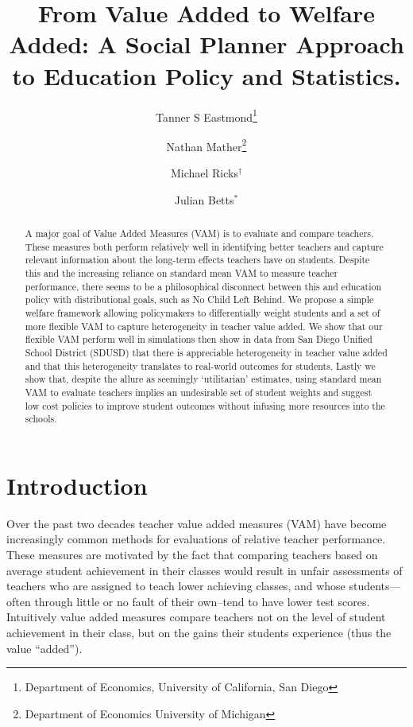 \documentclass[letterpaper,12pt]{article}
\title{From Value Added to Welfare Added: A Social Planner Approach to Education Policy and Statistics.}
\author{Tanner S Eastmond\thanks{Department of Economics, University of California, San Diego} \and Nathan Mather\thanks{Department of Economics University of Michigan} \and Michael Ricks$^\dagger$ \and Julian Betts$^*$}
\date{\vspace{-8ex}}
\begin{document}
\maketitle





\begin{abstract}
    A major goal of Value Added Measures (VAM) is to evaluate and compare teachers. These measures both perform relatively well in identifying better teachers and capture relevant information about the long-term effects teachers have on students. Despite this and the increasing reliance on standard mean VAM to measure teacher performance, there seems to be a philosophical disconnect between this and education policy with distributional goals, such as No Child Left Behind. We propose a simple welfare framework allowing policymakers to differentially weight students and a set of more flexible VAM to capture heterogeneity in teacher value added. We show that our flexible VAM perform well in simulations then show in data from San Diego Unified School District (SDUSD) that there is appreciable heterogeneity in teacher value added and that this heterogeneity translates to real-world outcomes for students. Lastly we show that, despite the allure as seemingly `utilitarian' estimates, using standard mean VAM to evaluate teachers implies an undesirable set of student weights and suggest low cost policies to improve student outcomes without infusing more resources into the schools.
\end{abstract}





\section{Introduction}

Over the past two decades teacher value added measures (VAM) have become increasingly common methods for evaluations of relative teacher performance. These measures are motivated by the fact that comparing teachers based on average student achievement in their classes would result in unfair assessments of teachers who are assigned to teach lower achieving classes, and whose students---often through little or no fault of their own--tend to have lower test scores. Intuitively value added measures compare teachers not on the level of student achievement in their class, but on the gains their students experience (thus the value ``added'').
\end{document}
